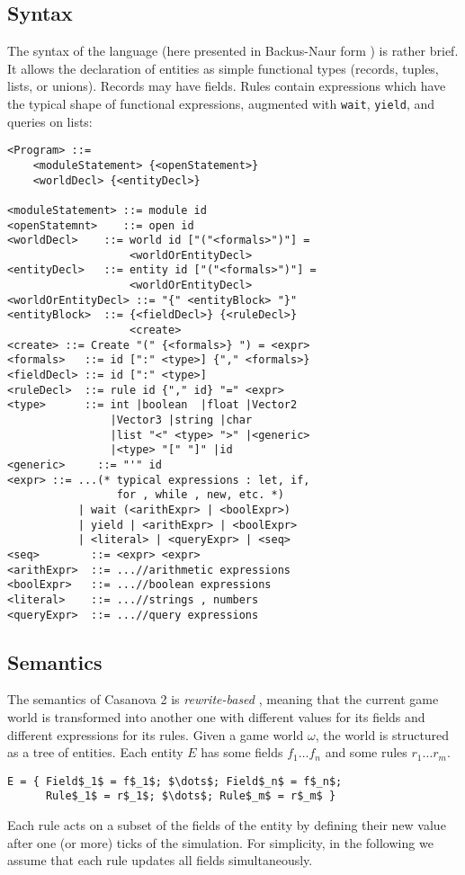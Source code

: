 

\subsection{Syntax}
The syntax of the language (here presented in Backus-Naur form \cite{strings2010backus}) is rather brief. It allows the declaration of entities as simple functional types (records, tuples, lists, or unions). Records may have fields. Rules contain expressions which have the typical shape of functional expressions, augmented with \texttt{wait}, \texttt{yield}, and queries on lists:
\begin{lstlisting}[caption=Casanova 2 syntax]
<Program> ::=
    <moduleStatement> {<openStatement>}
    <worldDecl> {<entityDecl>}

<moduleStatement> ::= module id
<openStatemnt>    ::= open id
<worldDecl>    ::= world id ["("<formals>")"] =
                   <worldOrEntityDecl>
<entityDecl>   ::= entity id ["("<formals>")"] =
                   <worldOrEntityDecl>
<worldOrEntityDecl> ::= "{" <entityBlock> "}"
<entityBlock>  ::= {<fieldDecl>} {<ruleDecl>}
                   <create>
<create> ::= Create "(" {<formals>} ") = <expr>
<formals>   ::= id [":" <type>] {"," <formals>}
<fieldDecl> ::= id [":" <type>]
<ruleDecl>  ::= rule id {"," id} "=" <expr>
<type>      ::= int |boolean  |float |Vector2
                |Vector3 |string |char
                |list "<" <type> ">" |<generic>
                |<type> "[" "]" |id
<generic>     ::= "'" id
<expr> ::= ...(* typical expressions : let, if,
                 for , while , new, etc. *)
           | wait (<arithExpr> | <boolExpr>)
           | yield | <arithExpr> | <boolExpr>
           | <literal> | <queryExpr> | <seq>
<seq>        ::= <expr> <expr>
<arithExpr>  ::= ...//arithmetic expressions
<boolExpr>   ::= ...//boolean expressions
<literal>    ::= ...//strings , numbers
<queryExpr>  ::= ...//query expressions
\end{lstlisting}


\subsection{Semantics}
The semantics of Casanova 2 is \textit{rewrite-based} \cite{klop1990term}, meaning that the current game world is transformed into another one with different values for its fields and different expressions for its rules.
Given a game world $\omega$, the world is structured as a tree of entities. Each entity $E$ has some fields $f_1 \dots f_n$ and some rules $r_1 \dots r_m$.
\begin{lstlisting}[mathescape]
E = { Field$_1$ = f$_1$; $\dots$; Field$_n$ = f$_n$;
      Rule$_1$ = r$_1$; $\dots$; Rule$_m$ = r$_m$ }
\end{lstlisting}
Each rule acts on a subset of the fields of the entity by defining their new value after one (or more) ticks of the simulation. For simplicity, in the following we assume that each rule updates all fields simultaneously.


